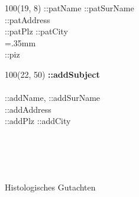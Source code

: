 \documentclass{scrreprt}
\begin{document}
%
 


\baselineskip10pt

\textblockorigin{0in}{0in}
\setlength{\TPHorizModule}{1mm}
\setlength{\TPVertModule}{1mm}


{
\scriptsize
\begin{textblock}{100}(19, 8) 
\noindent ::patName ::patSurName\\
::patAddress\\
::patPlz ::patCity\\
\X=.35mm        
\barheight=1cm 
\\
::piz\\
\end{textblock}
}

{
\begin{textblock}{100}(22, 50) 
\noindent 
\textbf{::addSubject} \\\\
::addName, ::addSurName\\
::addAddress\\
::addPlz ::addCity\\
\end{textblock}
}

~\\
\vspace{5.0cm}\\
\noindent\makebox[\linewidth]{\rule{\linewidth}{0.4pt}}\\\\
{\huge Histologisches Gutachten} \\
\end{document}
